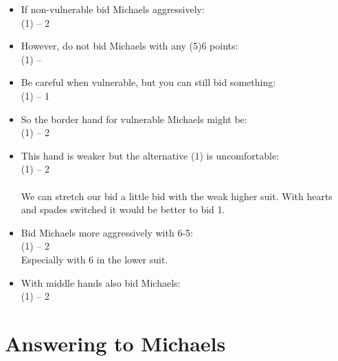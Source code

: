 \documentclass[12pt, a4paper]{article}
\begin{document}
\begin{itemize}

    \item
If non-vulnerable bid Michaels aggressively:\\
(1\clubs) -- 2\\

\item
However, do not bid Michaels with any (5)6 points:\\
(1\clubs) -- \\

\item
Be careful when vulnerable, but you can still bid something:\\
(1\clubs) -- 1\\

\item
So the border hand for vulnerable Michaels might be:\\
(1\clubs) -- 2\\

\item
This hand is weaker but the alternative (1\spades) is uncomfortable:\\
(1\clubs) -- 2\\
\\
We can stretch our bid a little bid with the
weak higher suit. With hearts and spades switched
it would be better to bid 1\spades.

\item
Bid Michaels more aggressively with 6-5:\\
(1\clubs) -- 2\\
Especially with 6 in the lower suit.

\item
With middle hands also bid Michaels:\\
(1\clubs) -- 2\clubs\\

\end{itemize}


\section{Answering to Michaels}
\end{document}
